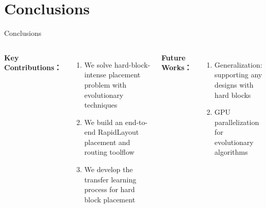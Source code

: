 \documentclass[10pt]{beamer}
\begin{document}
\section{Conclusions}

\begin{frame}{Conclusions}



  \begin{columns}[T, onlytextwidth]

    \vspace{0.5cm}
    
    {\fontsize{8}{10}\selectfont
    {\bf Key Contributions：}
    \begin{enumerate}
      \item We solve hard-block-intense placement problem with evolutionary techniques
      \item We build an end-to-end RapidLayout placement and routing toolflow
      \item We develop the transfer learning process for hard block placement
    \end{enumerate}

    {\bf Future Works：}
    \begin{enumerate}
      \item Generalization: supporting any designs with hard blocks
      \item GPU parallelization for evolutionary algorithms
    \end{enumerate}
    }



\end{columns}
\end{frame}
\end{document}
